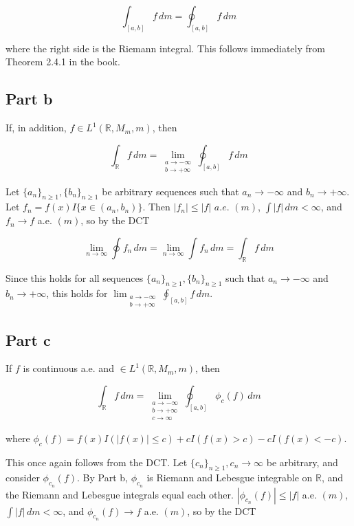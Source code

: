 \documentclass{article}
\newcommand{\R}{\mathbb{R}}
\begin{document}
\[
\int_{[a,b]} f\,dm = \oint_{[a,b]} f\,dm
\]

where the right side is the Riemann integral. This follows immediately from Theorem 2.4.1 in the book.

\subsection*{Part b}

If, in addition, $f \in L^1(\R, M_m, m)$, then

\[
\int_{\R} f\,dm = \lim_{\substack{a \rightarrow -\infty \\ b \rightarrow +\infty}} \oint_{[a,b]} f\,dm
\]

Let $\{a_n\}_{n \geq 1}, \{b_n\}_{n \geq 1}$ be arbitrary sequences such that $a_n \rightarrow -\infty$ and $b_n \rightarrow +\infty$. Let $f_n = f(x)I\{x \in (a_n, b_n)\}$. Then $|f_n| \leq |f|$ $a.e.$ $(m)$, $\int |f| \,dm < \infty$, and $f_n \rightarrow f$ a.e. $(m)$, so by the DCT

\[
\lim_{n \rightarrow \infty} \oint f_n\,dm = \lim_{n \rightarrow \infty} \int f_n\,dm = \int _\R f\,dm
\]

Since this holds for all sequences $\{a_n\}_{n \geq 1}, \{b_n\}_{n \geq 1}$ such that $a_n \rightarrow -\infty$ and $b_n \rightarrow +\infty$, this holds for $\lim_{\substack{a \rightarrow -\infty \\ b \rightarrow +\infty}} \oint_{[a,b]} f\,dm$.

\subsection*{Part c}

If $f$ is continuous a.e. and $\in L^1(\R, M_m, m)$, then

\[
\int_{\R} f\,dm = \lim_{\substack{a \rightarrow -\infty \\ b \rightarrow +\infty \\ c \rightarrow \infty}} \oint_{[a,b]} \phi_c(f)\,dm
\]

where $\phi_c(f) = f(x)I(|f(x)|\leq c) + cI(f(x) > c) - cI(f(x)<-c)$.

This once again follows from the DCT. Let $\{c_n\}_{n \geq 1}, c_n \rightarrow \infty$ be arbitrary, and consider $\phi_{c_n}(f)$. By Part b, $\phi_{c_n}$ is Riemann and Lebesgue integrable on $\R$, and the Riemann and Lebesgue integrals equal each other. $|\phi_{c_n}(f)| \leq |f|$ a.e. $(m)$, $\int |f|\,dm < \infty$, and $\phi_{c_n}(f) \rightarrow f$ a.e. $(m)$, so by the DCT
\end{document}
